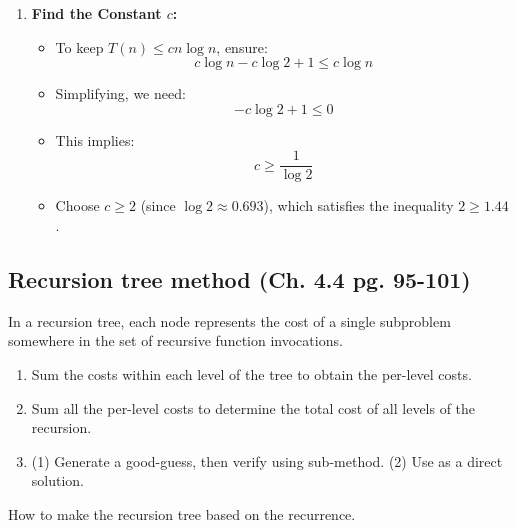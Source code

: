 \begin{example}
\begin{enumerate}
            \item \textbf{Find the Constant \( c \):}
            \begin{itemize}
                \item To keep \( T(n) \leq cn \log n \), ensure:
                \[
                c \log n - c \log 2 + 1 \leq c \log n
                \]
                \item Simplifying, we need:
                \[
                -c \log 2 + 1 \leq 0
                \]
                \item This implies:
                \[
                c \geq \frac{1}{\log 2}
                \]
                \item Choose \( c \geq 2 \) (since \( \log 2 \approx 0.693 \)), which satisfies the inequality $2 \geq 1.44$.
            \end{itemize}
        \end{enumerate}
    \end{example}

\subsection{Recursion tree method (Ch. 4.4 pg. 95-101)}
    \begin{definition}
        In a recursion tree, each node represents the cost of a single subproblem somewhere in the set of recursive function invocations.
    \end{definition}

    \begin{process}
        \begin{enumerate}
            \item Sum the costs within each level of the tree to obtain the per-level costs.
            \item Sum all the per-level costs to determine the total cost of all levels of the recursion. 
            \item (1) Generate a good-guess, then verify using sub-method. (2) Use as a direct solution.
        \end{enumerate}
    \end{process}

    \begin{intuition}
        How to make the recursion tree based on the recurrence.
    \end{intuition}

